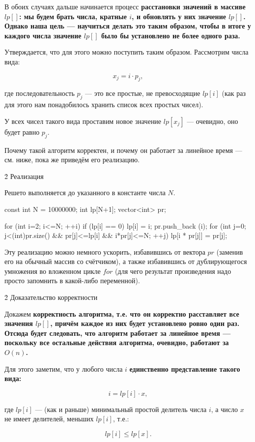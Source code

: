 В обоих случаях дальше начинается процесс \bf{расстановки значений} в массиве $lp[]$: мы будем брать числа, \bf{кратные} $i$, и обновлять у них значение $lp[]$. Однако наша цель --- научиться делать это таким образом, чтобы в итоге у каждого числа значение $lp[]$ было бы установлено не более одного раза.

Утверждается, что для этого можно поступить таким образом. Рассмотрим числа вида:

$$ x_j = i \cdot p_j, $$

где последовательность $p_j$ --- это все простые, не превосходящие $lp[i]$ (как раз для этого нам понадобилось хранить список всех простых чисел).

У всех чисел такого вида проставим новое значение $lp[x_j]$ --- очевидно, оно будет равно $p_j$.

Почему такой алгоритм корректен, и почему он работает за линейное время --- см. ниже, пока же приведём его реализацию.


\h2{ Реализация }

Решето выполняется до указанного в константе числа $N$.

\code
const int N = 10000000;
int lp[N+1];
vector<int> pr;

for (int i=2; i<=N; ++i) {
	if (lp[i] == 0) {
		lp[i] = i;
		pr.push_back (i);
	}
	for (int j=0; j<(int)pr.size() && pr[j]<=lp[i] && i*pr[j]<=N; ++j)
		lp[i * pr[j]] = pr[j];
}
\endcode

Эту реализацию можно немного ускорить, избавившись от вектора $pr$ (заменив его на обычный массив со счётчиком), а также избавившись от дублирующегося умножения во вложенном цикле $for$ (для чего результат произведения надо просто запомнить в какой-либо переменной).


\h2{ Доказательство корректности }

Докажем \bf{корректность} алгоритма, т.е. что он корректно расставляет все значения $lp[]$, причём каждое из них будет установлено ровно один раз. Отсюда будет следовать, что алгоритм работает за линейное время --- поскольку все остальные действия алгоритма, очевидно, работают за $O (n)$.

Для этого заметим, что у любого числа $i$ \bf{единственно представление} такого вида:

$$ i = lp[i] \cdot x, $$

где $lp[i]$ --- (как и раньше) минимальный простой делитель числа $i$, а число $x$ не имеет делителей, меньших $lp[i]$, т.е.:

$$ lp[i] \le lp[x]. $$

